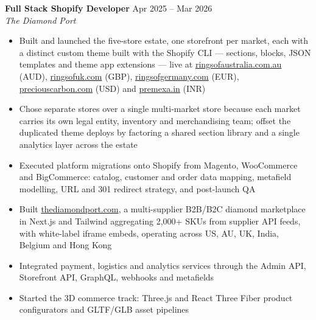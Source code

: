 \documentclass[10pt]{article}
\begin{document}
\textbf{Full Stack Shopify Developer} \hfill Apr 2025 -- Mar 2026 \\
\textit{The Diamond Port}
\begin{itemize}
  \item Built and launched the five-store estate, one storefront per market, each with a distinct custom theme built with the Shopify CLI --- sections, blocks, JSON templates and theme app extensions --- live at \href{https://ringsofaustralia.com.au}{ringsofaustralia.com.au} (AUD), \href{https://ringsofuk.com}{ringsofuk.com} (GBP), \href{https://ringsofgermany.com}{ringsofgermany.com} (EUR), \href{https://www.preciouscarbon.com}{preciouscarbon.com} (USD) and \href{https://premexa.in}{premexa.in} (INR)
  \item Chose separate stores over a single multi-market store because each market carries its own legal entity, inventory and merchandising team; offset the duplicated theme deploys by factoring a shared section library and a single analytics layer across the estate
  \item Executed platform migrations onto Shopify from Magento, WooCommerce and BigCommerce: catalog, customer and order data mapping, metafield modelling, URL and 301 redirect strategy, and post-launch QA
  \item Built \href{https://thediamondport.com}{thediamondport.com}, a multi-supplier B2B/B2C diamond marketplace in Next.js and Tailwind aggregating 2,000+ SKUs from supplier API feeds, with white-label iframe embeds, operating across US, AU, UK, India, Belgium and Hong Kong
  \item Integrated payment, logistics and analytics services through the Admin API, Storefront API, GraphQL, webhooks and metafields
  \item Started the 3D commerce track: Three.js and React Three Fiber product configurators and GLTF/GLB asset pipelines
\end{itemize}

\vspace{1pt}
\end{document}
